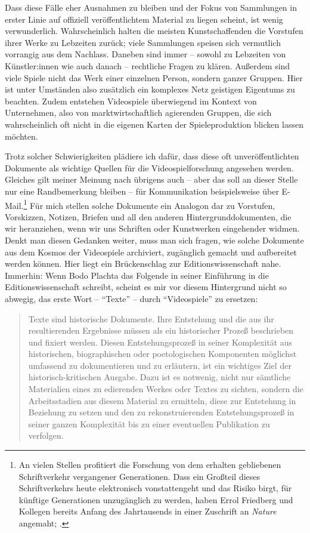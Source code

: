 \documentclass[a5paper,pagesize,numbers=noenddot]{scrbook}
\begin{document}
Dass diese Fälle eher Ausnahmen zu bleiben und der Fokus von Sammlungen in erster Linie auf offiziell veröffentlichtem Material zu liegen scheint, ist wenig verwunderlich.
Wahrscheinlich halten die meisten Kunstschaffenden die Vorstufen ihrer Werke zu Lebzeiten zurück; viele Sammlungen speisen sich vermutlich vorrangig aus dem Nachlass.
Daneben sind immer -- sowohl zu Lebzeiten von Künstler:innen wie auch danach -- rechtliche Fragen zu klären.
Außerdem sind viele Spiele nicht das Werk einer einzelnen Person, sondern ganzer Gruppen.
Hier ist unter Umständen also zusätzlich ein komplexes Netz geistigen Eigentums zu beachten.
Zudem entstehen Videospiele überwiegend im Kontext von Unternehmen, also von marktwirtschaftlich agierenden Gruppen, die sich wahrscheinlich oft nicht in die eigenen Karten der Spieleproduktion blicken lassen möchten.

Trotz solcher Schwierigkeiten plädiere ich dafür, dass diese oft unveröffentlichten Dokumente als wichtige Quellen für die Videospielforschung angesehen werden.
Gleiches gilt meiner Meinung nach übrigens auch -- aber das soll an dieser Stelle nur eine Randbemerkung bleiben -- für Kommunikation beispielsweise über E-Mail.\footnote{An vielen Stellen profitiert die Forschung von dem erhalten gebliebenen Schriftverkehr vergangener Generationen.
Dass ein Großteil dieses Schriftverkehrs heute elektronisch vonstattengeht und das Risiko birgt, für künftige Generationen unzugänglich zu werden, haben Errol Friedberg und Kollegen bereits Anfang des Jahrtausends in einer Zuschrift an \textit{Nature} angemaht; \autocite[vgl.][]{friedberg_e_mail_2003}.}
Für mich stellen solche Dokumente ein Analogon dar zu Vorstufen, Vorskizzen, Notizen, Briefen und all den anderen Hintergrunddokumenten, die wir heranziehen, wenn wir uns Schriften oder Kunstwerken eingehender widmen.
Denkt man diesen Gedanken weiter, muss man sich fragen, wie solche Dokumente aus dem Kosmos der Videospiele archiviert, zugänglich gemacht und aufbereitet werden können.
Hier liegt ein Brückenschlag zur Editionswissenschaft nahe.
Immerhin: Wenn Bodo Plachta das Folgende in seiner Einführung in die Editionswissenschaft schreibt, scheint es mir vor diesem Hintergrund nicht so abwegig, das erste Wort -- \enquote{Texte} -- durch \enquote{Videospiele} zu ersetzen:

\begin{quote}
   Texte sind historische Dokumente.
   Ihre Entstehung und die aus ihr resultierenden Ergebnisse müssen als ein historischer Prozeß beschrieben und fixiert werden.
   Diesen Entstehungsprozeß in seiner Komplexität aus historischen, biographischen oder poetologischen Komponenten möglichst umfassend zu dokumentieren und zu erläutern, ist ein wichtiges Ziel der historisch-kritischen Ausgabe.
   Dazu ist es notwenig, nicht nur sämtliche Materialien eines zu edierenden Werkes oder Textes zu sichten, sondern die Arbeitsstadien aus diesem Material zu ermitteln, diese zur Entstehung in Beziehung zu setzen und den zu rekonstruierenden Entstehungsprozeß in seiner ganzen Komplexität bis zu einer eventuellen Publikation zu verfolgen.\autocite[S.~13\,f.]{plachta_editionswissenschaft_1997}
\end{quote}
\end{document}
